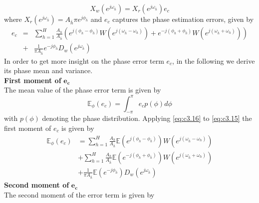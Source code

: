 \begin{equation}\label{eq:c3.14}
	X_w(e^{j\omega_{\bar{h}}})=X_r(e^{j\omega_{\bar{h}}})e_c
\end{equation}
where $X_r(e^{j\omega_{\bar{h}}})=A_{\bar{h}}\pi e^{j\phi_{\bar{h}}}$ and $e_c$ captures the phase estimation errors, given by
\begin{eqnarray}\label{eq:c3.15}
	e_c&=&\sum_{h=1}^H\frac{A_h}{A_{\bar{h}}}\left( e^{j(\phi_h-\phi_{\bar{h}})}W(e^{j(\omega_{\bar{h}}-\omega_h)})+ e^{-j(\phi_h+\phi_{\bar{h}})}W(e^{j(\omega_{\bar{h}}+\omega_h)}) \right)\nonumber\\
	&+& \frac{1}{\pi A_{\bar{h}}}e^{-j\phi_{\bar{h}}}D_w(e^{j\omega_{\bar{h}}})
\end{eqnarray}
In order to get more insight on the phase error term $e_c$, in the following we derive its phase mean and variance.\\
\textbf{First moment of }$\boldsymbol{e_c}$~\\
\noindent The mean value of the phase error term is given by
\begin{equation}\label{eq:c3.16}
	\mathbb{E}_\phi(e_c)=\int_{-\pi}^\pi e_c p(\phi)d\phi
\end{equation}
with $p(\phi)$ denoting the phase distribution. Applying \eqref{eq:c3.16} to \eqref{eq:c3.15} the first moment of $e_c$ is given by
\begin{equation}\label{eq:c3.17}
	\begin{split}
		\mathbb{E}_\phi(e_c) &= \sum_{h=1}^H\frac{A_h}{A_{\bar{h}}} \mathbb{E}(e^{j(\phi_h-\phi_{\bar{h}})})W(e^{j(\omega_{\bar{h}}-\omega_h)})\\
		&+ \sum_{h=1}^H\frac{A_h}{A_{\bar{h}}} \mathbb{E}(e^{-j(\phi_h+\phi_{\bar{h}})})W(e^{j(\omega_{\bar{h}}+\omega_h)})\\
		&+ \frac{1}{\pi A_{\bar{h}}}\mathbb{E}(e^{-j\phi_{\bar{h}}})D_w(e^{j\omega_{\bar{h}}})
	\end{split}
\end{equation}
\textbf{Second moment of }$\boldsymbol{e_c}$~\\
\noindent {}The second moment of the error term is given by
